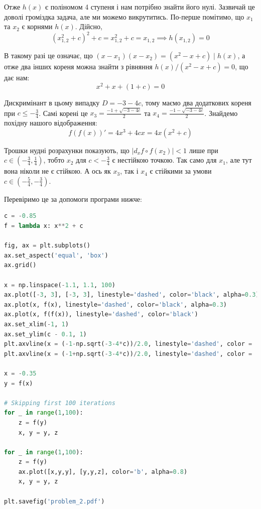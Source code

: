 \documentclass[oneside,solution]{tmpl}
\begin{document}
Отже $h(x)$ є поліномом 4 ступеня і нам потрібно знайти його нулі. Зазвичай це доволі громіздка задача, але ми можемо викрутитись. По-перше помітимо, що $x_1$ та $x_2$ є корнями $h(x)$. Дійсно,
\begin{equation}
    (x_{1,2}^2+c)^2 + c = x_{1,2}^2 + c = x_{1,2} \implies h(x_{1,2}) = 0
\end{equation}

В такому разі це означає, що $(x-x_1)(x-x_2)=(x^2-x+c) \mid h(x)$, а отже два інших кореня можна знайти з рівняння $h(x)/(x^2-x+c) = 0$, що дає нам:
\begin{equation}
    x^2 + x + (1+c) = 0
\end{equation}

Дискримінант в цьому випадку $D = -3-4c$, тому маємо два додаткових кореня при $c \leq -\frac{3}{4}$. Самі корені це $x_3 = \frac{-1+\sqrt{-3-4c}}{2}$ та $x_4 = \frac{-1-\sqrt{-3-4c}}{2}$. Знайдемо похідну нашого відображення:
\begin{equation}
    f(f(x))' = 4x^3 + 4cx = 4x(x^2 + c)
\end{equation}

Трошки нудні розрахунки показують, що $|d_x f\circ f(x_2)| < 1$ лише при $c \in (-\frac{3}{4}, \frac{1}{4})$, тобто $x_2$ для $c < -\frac{3}{4}$ є нестійкою точкою. Так само для $x_1$, але тут вона ніколи не є стійкою. А ось як $x_3$, так і $x_4$ є стійкими за умови $c \in (-\frac{5}{4}, -\frac{3}{4})$. 

Перевіримо це за допомоги програми нижче:
\begin{lstlisting}[language=Python]
c = -0.85
f = lambda x: x**2 + c

fig, ax = plt.subplots()
ax.set_aspect('equal', 'box')
ax.grid()

x = np.linspace(-1.1, 1.1, 100)
ax.plot([-3, 3], [-3, 3], linestyle='dashed', color='black', alpha=0.3)
ax.plot(x, f(x), linestyle='dashed', color='black', alpha=0.3)
ax.plot(x, f(f(x)), linestyle='dashed', color='black')
ax.set_xlim(-1, 1)
ax.set_ylim(c - 0.1, 1)
plt.axvline(x = (-1-np.sqrt(-3-4*c))/2.0, linestyle='dashed', color = 'green', label = 'axvline - full height')
plt.axvline(x = (-1+np.sqrt(-3-4*c))/2.0, linestyle='dashed', color = 'green', label = 'axvline - full height')

x = -0.35
y = f(x)

# Skipping first 100 iterations
for _ in range(1,100):
    z = f(y)
    x, y = y, z

for _ in range(1,100):
    z = f(y)
    ax.plot([x,y,y], [y,y,z], color='b', alpha=0.8)
    x, y = y, z
    
plt.savefig('problem_2.pdf')
\end{lstlisting}
\end{document}
